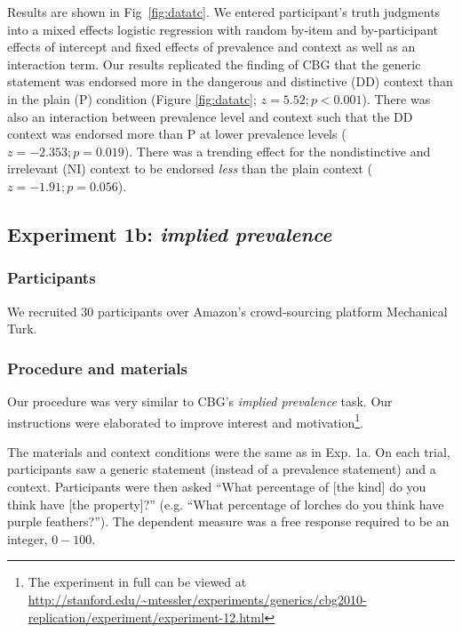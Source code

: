 \documentclass[10pt,letterpaper]{article}
\begin{document}

Results are shown in Fig~\ref{fig:datatc}. We entered participant's truth judgments into a mixed effects logistic regression with random by-item and by-participant effects of intercept and fixed effects of prevalence and context as well as an interaction term.  Our results replicated the finding of CBG that the generic statement was endorsed more in the dangerous and distinctive (DD) context than in the plain (P) condition (Figure \ref{fig:datatc}; $z = 5.52; p < 0.001$). There was also an interaction between prevalence level and context such that the DD context was endorsed more than P at lower prevalence levels ($z=-2.353; p = 0.019$). There was a trending effect for the nondistinctive and irrelevant (NI) context to be endorsed \emph{less} than the plain context ($z=-1.91; p = 0.056$).

\subsection{Experiment 1b: \emph{implied prevalence}}

\subsubsection{Participants}

We recruited 30 participants over Amazon's crowd-sourcing platform Mechanical Turk.  

\subsubsection{Procedure and materials}

Our procedure was very similar to CBG's \emph{implied prevalence} task. Our instructions were elaborated to improve interest and motivation\footnote{The experiment in full can be viewed at \url{http://stanford.edu/~mtessler/experiments/generics/cbg2010-replication/experiment/experiment-12.html}}. 

The materials and context conditions were the same as in Exp. 1a. 
On each trial, participants saw a generic statement (instead of a prevalence statement) and a context. 
Participants were then asked ``What percentage of [the kind] do you think have [the property]?'' (e.g. ``What percentage of lorches do you think have  purple feathers?''). The dependent measure was a free response required to be an integer, $0-100$. 
\end{document}
